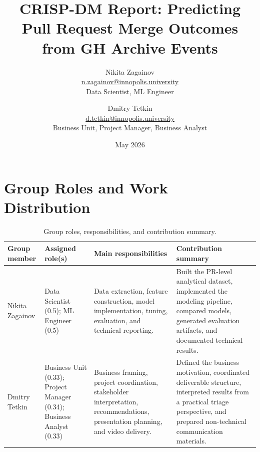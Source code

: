 \documentclass[11pt,a4paper]{article}
\title{CRISP-DM Report: Predicting Pull Request Merge Outcomes from GH Archive Events}
\author{%
    Nikita Zagainov\\
    \href{mailto:n.zagainov@innopolis.university}{n.zagainov@innopolis.university}\\
    Data Scientist, ML Engineer
    \and
    Dmitry Tetkin\\
    \href{mailto:d.tetkin@innopolis.university}{d.tetkin@innopolis.university}\\
    Business Unit, Project Manager, Business Analyst
}
\date{May 2026}
\begin{document}
\maketitle

\section*{Group Roles and Work Distribution}

\begin{table}[H]
    \centering
    \small
    \caption{Group roles, responsibilities, and contribution summary.}
    \begin{tabularx}{\textwidth}{p{}p{}XX}
        \toprule
        Group member & Assigned role(s) & Main responsibilities & Contribution summary \\
        \midrule
        Nikita Zagainov
        & Data Scientist (0.5); ML Engineer (0.5)
        & Data extraction, feature construction, model implementation, tuning, evaluation, and technical reporting.
        & Built the PR-level analytical dataset, implemented the modeling pipeline, compared models, generated evaluation artifacts, and documented technical results. \\
        Dmitry Tetkin
        & Business Unit (0.33); Project Manager (0.34); Business Analyst (0.33)
        & Business framing, project coordination, stakeholder interpretation, recommendations, presentation planning, and video delivery.
        & Defined the business motivation, coordinated deliverable structure, interpreted results from a practical triage perspective, and prepared non-technical communication materials. \\
        \bottomrule
    \end{tabularx}
\end{table}







\end{document}
